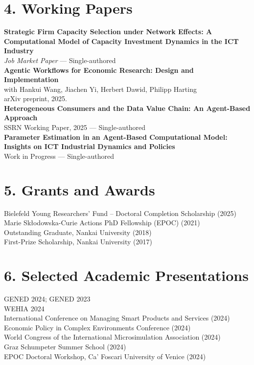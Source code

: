\documentclass{nfr}
\begin{document}
\section*{4. Working Papers}

\textbf{Strategic Firm Capacity Selection under Network Effects: A Computational Model of Capacity Investment Dynamics in the ICT Industry} \\
\textit{Job Market Paper} --- Single-authored\\

\textbf{Agentic Workflows for Economic Research: Design and Implementation} \\
with Hankui Wang, Jiachen Yi, Herbert Dawid, Philipp Harting \\
arXiv preprint, 2025.\\

\textbf{Heterogeneous Consumers and the Data Value Chain: An Agent-Based Approach} \\
SSRN Working Paper, 2025 --- Single-authored\\

\textbf{Parameter Estimation in an Agent-Based Computational Model: Insights on ICT Industrial Dynamics and Policies} \\
Work in Progress --- Single-authored

\section*{5. Grants and Awards}

Bielefeld Young Researchers’ Fund -- Doctoral Completion Scholarship (2025) \\
Marie Skłodowska-Curie Actions PhD Fellowship (EPOC) (2021) \\
Outstanding Graduate, Nankai University (2018) \\
First-Prize Scholarship, Nankai University (2017)

\section*{6. Selected Academic Presentations}

GENED 2024; GENED 2023 \\
WEHIA 2024 \\
International Conference on Managing Smart Products and Services (2024) \\
Economic Policy in Complex Environments Conference (2024) \\
World Congress of the International Microsimulation Association (2024) \\
Graz Schumpeter Summer School (2024) \\
EPOC Doctoral Workshop, Ca' Foscari University of Venice (2024)
\end{document}
